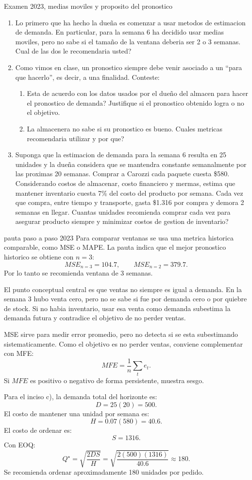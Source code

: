 \begin{enunciado}{Examen 2023, medias moviles y proposito del pronostico}
\begin{enumerate}[label=\alph*)]
  \item Lo primero que ha hecho la dueña es comenzar a usar metodos de estimacion de demanda. En particular, para la semana 6 ha decidido usar medias moviles, pero no sabe si el tamaño de la ventana deberia ser 2 o 3 semanas. Cual de las dos le recomendaria usted?
  \item Como vimos en clase, un pronostico siempre debe venir asociado a un ``para que hacerlo'', es decir, a una finalidad. Conteste:
  \begin{enumerate}[label=\roman*.]
    \item Esta de acuerdo con los datos usados por el dueño del almacen para hacer el pronostico de demanda? Justifique si el pronostico obtenido logra o no el objetivo.
    \item La almacenera no sabe si su pronostico es bueno. Cuales metricas recomendaria utilizar y por que?
  \end{enumerate}
  \item Suponga que la estimacion de demanda para la semana 6 resulta en 25 unidades y la dueña considera que se mantendra constante semanalmente por las proximas 20 semanas. Comprar a Carozzi cada paquete cuesta \$580. Considerando costos de almacenar, costo financiero y mermas, estima que mantener inventario cuesta 7\% del costo del producto por semana. Cada vez que compra, entre tiempo y transporte, gasta \$1.316 por compra y demora 2 semanas en llegar. Cuantas unidades recomienda comprar cada vez para asegurar producto siempre y minimizar costos de gestion de inventario?
\end{enumerate}
\end{enunciado}

\begin{pautacompleta}{pauta paso a paso 2023}
Para comparar ventanas se usa una metrica historica comparable, como MSE o MAPE. La pauta indica que el mejor pronostico historico se obtiene con $n=3$:
\[
  MSE_{n=3}=104.7,\qquad MSE_{n=2}=379.7.
\]
Por lo tanto se recomienda ventana de 3 semanas.

El punto conceptual central es que ventas no siempre es igual a demanda. En la semana 3 hubo venta cero, pero no se sabe si fue por demanda cero o por quiebre de stock. Si no habia inventario, usar esa venta como demanda subestima la demanda futura y contradice el objetivo de no perder ventas.

MSE sirve para medir error promedio, pero no detecta si se esta subestimando sistematicamente. Como el objetivo es no perder ventas, conviene complementar con MFE:
\[
  MFE=\frac{1}{n}\sum_t e_t.
\]
Si $MFE$ es positivo o negativo de forma persistente, muestra sesgo.

Para el inciso c), la demanda total del horizonte es:
\[
  D=25(20)=500.
\]
El costo de mantener una unidad por semana es:
\[
  H=0.07(580)=40.6.
\]
El costo de ordenar es:
\[
  S=1316.
\]
Con EOQ:
\[
  Q^\star=\sqrt{\frac{2DS}{H}}
  =\sqrt{\frac{2(500)(1316)}{40.6}}
  \approx 180.
\]
Se recomienda ordenar aproximadamente 180 unidades por pedido.
\end{pautacompleta}

